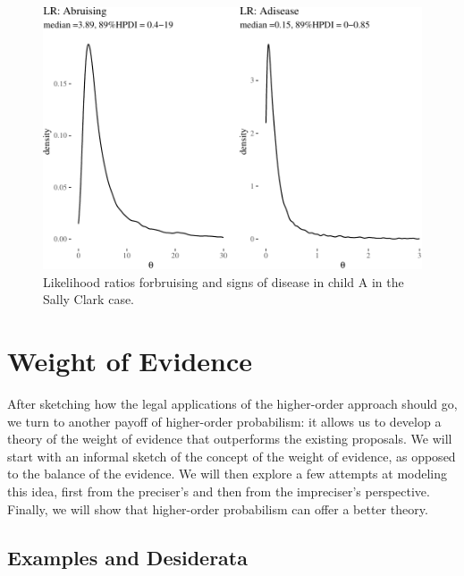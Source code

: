 \documentclass[
  10pt,
  dvipsnames,enabledeprecatedfontcommands]{scrartcl}
\begin{document}
\begin{figure}[H]


\begin{center}\includegraphics[width=0.9\linewidth]{paper-outline_files/figure-latex/SClrs-1} \end{center}

\caption{Likelihood ratios forbruising and signs of disease in child A in the Sally Clark case.}
\label{fig:SClrs}

\end{figure}

\hypertarget{weight-of-evidence}{%
\section{Weight of Evidence}\label{weight-of-evidence}}

\label{sec:weight}

After sketching how the legal applications of the higher-order approach
should go, we turn to another payoff of higher-order probabilism: it
allows us to develop a theory of the weight of evidence that outperforms
the existing proposals. We will start with an informal sketch of the
concept of the weight of evidence, as opposed to the balance of the
evidence. We will then explore a few attempts at modeling this idea,
first from the preciser's and then from the impreciser's perspective.
Finally, we will show that higher-order probabilism can offer a better
theory.

\hypertarget{examples-and-desiderata}{%
\subsection{Examples and Desiderata}\label{examples-and-desiderata}}
\end{document}
